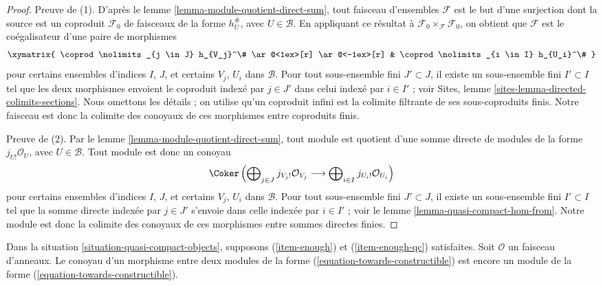 \begin{proof}

Preuve de (1). D'après le lemme
\ref{lemma-module-quotient-direct-sum}, tout faisceau d'ensembles
$\mathcal{F}$ est le but d'une surjection dont la source est un coproduit
$\mathcal{F}_0$ de faisceaux de la forme $h_{U}^\#$, avec
$U \in \mathcal{B}$. En appliquant ce résultat à
$\mathcal{F}_0 \times_\mathcal{F} \mathcal{F}_0$, on obtient que
$\mathcal{F}$ est le coégalisateur d'une paire de morphismes
$$
\xymatrix{
\coprod\nolimits_{j \in J} h_{V_j}^\#
\ar@<1ex>[r] \ar@<-1ex>[r] &
\coprod\nolimits_{i \in I} h_{U_i}^\#
}
$$
pour certains ensembles d'indices $I$, $J$, et certains $V_j$, $U_i$ dans
$\mathcal{B}$. Pour tout sous-ensemble fini $J' \subset J$, il existe un
sous-ensemble fini $I' \subset I$ tel que les deux morphismes envoient le
coproduit indexé par $j \in J'$ dans celui indexé par $i \in I'$ ; voir
Sites, lemme \ref{sites-lemma-directed-colimits-sections}. Nous omettons les
détails ; on utilise qu'un coproduit infini est la colimite filtrante de ses
sous-coproduits finis. Notre faisceau est donc la colimite des conoyaux de
ces morphismes entre coproduits finis.

\medskip\noindent

Preuve de (2). Par le lemme \ref{lemma-module-quotient-direct-sum}, tout
module est quotient d'une somme directe de modules de la forme
$j_{U!}\mathcal{O}_U$, avec $U \in \mathcal{B}$. Tout module est donc un
conoyau
$$
\Coker\left(
\bigoplus\nolimits_{j \in J} j_{V_j!}\mathcal{O}_{V_j}
\longrightarrow
\bigoplus\nolimits_{i \in I} j_{U_i!}\mathcal{O}_{U_i}
\right)
$$
pour certains ensembles d'indices $I$, $J$, et certains $V_j$, $U_i$ dans
$\mathcal{B}$. Pour tout sous-ensemble fini $J' \subset J$, il existe un
sous-ensemble fini $I' \subset I$ tel que la somme directe indexée par
$j \in J'$ s'envoie dans celle indexée par $i \in I'$ ; voir le lemme
\ref{lemma-quasi-compact-hom-from}. Notre module est donc la colimite des
conoyaux de ces morphismes entre sommes directes finies.

\end{proof}

\begin{lemma}

\label{lemma-cokernel-map-towards-constructibles}

Dans la situation \ref{situation-quasi-compact-objects}, supposons
(\ref{item-enough}) et (\ref{item-enough-qc}) satisfaites. Soit
$\mathcal{O}$ un faisceau d'anneaux. Le conoyau d'un morphisme entre deux
modules de la forme (\ref{equation-towards-constructible}) est encore un
module de la forme (\ref{equation-towards-constructible}).

\end{lemma}

